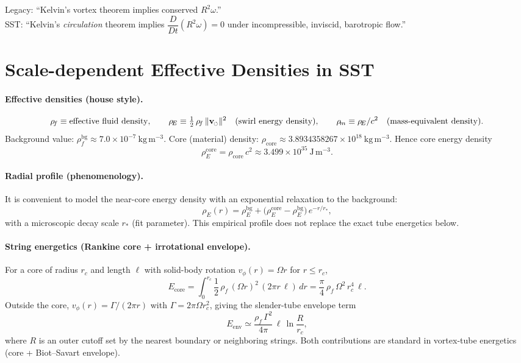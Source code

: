 \documentclass[11pt]{article}
\newcommand{\vnorm}{\lVert \mathbf{v}_{\mkern-2mu\scriptscriptstyle\boldsymbol{\circlearrowleft}} \rVert}               %
\newcommand{\rhoF}{\rho_{\!f}}                           %
\newcommand{\rhoE}{\rho_{\!E}}                           %
\newcommand{\rhoM}{\rho_{\!m}}                           %
\newcommand{\rhoC}{\rho_{\mathrm{core}}} %
\begin{document}
		Legacy: “Kelvin’s vortex theorem implies conserved $R^2\omega$.”\\
		SST: “Kelvin’s \emph{circulation} theorem implies $\dfrac{D}{Dt}(R^2\omega)=0$ under incompressible, inviscid, barotropic flow.”



	\section*{Scale-dependent Effective Densities in SST}
		\paragraph{Effective densities (house style).}
		\[
			\rhoF \equiv \text{effective fluid density},\qquad
			\rhoE \equiv \tfrac12\,\rhoF\,\vnorm^{2}\quad(\text{swirl energy density}),\qquad
			\rhoM \equiv \rhoE/c^{2}\quad(\text{mass-equivalent density}).
		\]
		Background value: $\rhoF^{\mathrm{bg}}\approx 7.0\times 10^{-7}\ \mathrm{kg\,m^{-3}}$.
		Core (material) density: $\rhoC\approx 3.8934358267\times 10^{18}\ \mathrm{kg\,m^{-3}}$.
		Hence core energy density
		\[
			\rhoE^{\text{core}}=\rhoC\,c^{2}\approx 3.499\times 10^{35}\ \mathrm{J\,m^{-3}}.
		\]

		\paragraph{Radial profile (phenomenology).}
		It is convenient to model the near-core energy density with an exponential relaxation to the background:
		\[
			\rhoE(r)=\rhoE^{\mathrm{bg}}+\bigl(\rhoE^{\text{core}}-\rhoE^{\mathrm{bg}}\bigr)\,e^{-r/r_\ast},
		\]
		with a microscopic decay scale $r_\ast$ (fit parameter). This empirical profile does not replace the exact tube energetics below.

		\paragraph{String energetics (Rankine core + irrotational envelope).}
		For a core of radius $r_c$ and length $\ell$ with solid-body rotation $v_\phi(r)=\Omega r$ for $r\le r_c$,
		\[
			E_{\text{core}}
			=\int_{0}^{r_c}\!\!\frac12\,\rhoF\,(\Omega r)^2\,(2\pi r\,\ell)\,dr
			=\frac{\pi}{4}\,\rhoF\,\Omega^2\,r_c^4\,\ell.
		\]
		Outside the core, $v_\phi(r)=\Gamma/(2\pi r)$ with $\Gamma=2\pi\Omega r_c^{2}$, giving the slender-tube envelope term
		\[
			E_{\text{env}}\simeq \frac{\rhoF\,\Gamma^2}{4\pi}\,\ell\,\ln\!\frac{R}{r_c},
		\]
		where $R$ is an outer cutoff set by the nearest boundary or neighboring strings. Both contributions are standard in vortex-tube energetics (core + Biot–Savart envelope).
\end{document}
